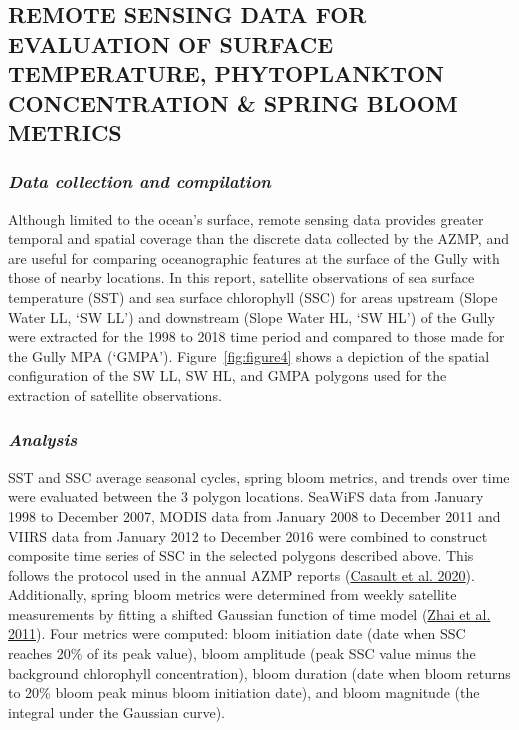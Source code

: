 \documentclass[12pt]{article}\usepackage[]{graphicx}\usepackage[]{color}
\begin{document}
\hypertarget{remote-sensing-data-for-evaluation-of-surface-temperature-phytoplankton-concentration-spring-bloom-metrics}{%
\subsection{\texorpdfstring{\textbf{REMOTE SENSING DATA FOR EVALUATION OF SURFACE TEMPERATURE, PHYTOPLANKTON CONCENTRATION \& SPRING BLOOM METRICS}}{REMOTE SENSING DATA FOR EVALUATION OF SURFACE TEMPERATURE, PHYTOPLANKTON CONCENTRATION \& SPRING BLOOM METRICS}}\label{remote-sensing-data-for-evaluation-of-surface-temperature-phytoplankton-concentration-spring-bloom-metrics}}

\hypertarget{data-collection-and-compilation-3}{%
\subsubsection{\texorpdfstring{\emph{Data collection and compilation}}{Data collection and compilation}}\label{data-collection-and-compilation-3}}

Although limited to the ocean's surface, remote sensing data provides greater temporal and spatial coverage than the discrete data collected by the AZMP, and are useful for comparing oceanographic features at the surface of the Gully with those of nearby locations. In this report, satellite observations of sea surface temperature (SST) and sea surface chlorophyll (SSC) for areas upstream (Slope Water LL, `SW LL') and downstream (Slope Water HL, `SW HL') of the Gully were extracted for the 1998 to 2018 time period and compared to those made for the Gully MPA (`GMPA'). Figure~\ref{fig:figure4} shows a depiction of the spatial configuration of the SW LL, SW HL, and GMPA polygons used for the extraction of satellite observations.

\hypertarget{analysis-3}{%
\subsubsection{\texorpdfstring{\emph{Analysis}}{Analysis}}\label{analysis-3}}

SST and SSC average seasonal cycles, spring bloom metrics, and trends over time were evaluated between the 3 polygon locations. SeaWiFS data from January 1998 to December 2007, MODIS data from January 2008 to December 2011 and VIIRS data from January 2012 to December 2016 were combined to construct composite time series of SSC in the selected polygons described above. This follows the protocol used in the annual AZMP reports (\protect\hyperlink{ref-casault_2020}{Casault et al. 2020}). Additionally, spring bloom metrics were determined from weekly satellite measurements by fitting a shifted Gaussian function of time model (\protect\hyperlink{ref-zhai_2011}{Zhai et al. 2011}). Four metrics were computed: bloom initiation date (date when SSC reaches 20\% of its peak value), bloom amplitude (peak SSC value minus the background chlorophyll concentration), bloom duration (date when bloom returns to 20\% bloom peak minus bloom initiation date), and bloom magnitude (the integral under the Gaussian curve).
\end{document}
